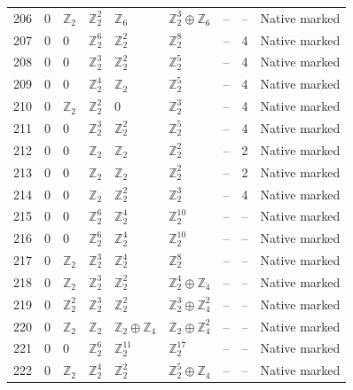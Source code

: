 \documentclass[10pt]{article}
\begin{document}
\begin{longtable}{r|lllll|rrl}
206 & $0$ & $\mathbb{Z}_{2}$ & $\mathbb{Z}_{2}^{2}$ & $\mathbb{Z}_{6}$ & $\mathbb{Z}_{2}^{3}\oplus \mathbb{Z}_{6}$ & -- & -- & Native marked\\
207 & $0$ & $0$ & $\mathbb{Z}_{2}^{6}$ & $\mathbb{Z}_{2}^{2}$ & $\mathbb{Z}_{2}^{8}$ & -- & 4 & Native marked\\
208 & $0$ & $0$ & $\mathbb{Z}_{2}^{3}$ & $\mathbb{Z}_{2}^{2}$ & $\mathbb{Z}_{2}^{5}$ & -- & 4 & Native marked\\
209 & $0$ & $0$ & $\mathbb{Z}_{2}^{4}$ & $\mathbb{Z}_{2}$ & $\mathbb{Z}_{2}^{5}$ & -- & 4 & Native marked\\
210 & $0$ & $\mathbb{Z}_{2}$ & $\mathbb{Z}_{2}^{2}$ & $0$ & $\mathbb{Z}_{2}^{3}$ & -- & 4 & Native marked\\
211 & $0$ & $0$ & $\mathbb{Z}_{2}^{3}$ & $\mathbb{Z}_{2}^{2}$ & $\mathbb{Z}_{2}^{5}$ & -- & 4 & Native marked\\
212 & $0$ & $0$ & $\mathbb{Z}_{2}$ & $\mathbb{Z}_{2}$ & $\mathbb{Z}_{2}^{2}$ & -- & 2 & Native marked\\
213 & $0$ & $0$ & $\mathbb{Z}_{2}$ & $\mathbb{Z}_{2}$ & $\mathbb{Z}_{2}^{2}$ & -- & 2 & Native marked\\
214 & $0$ & $0$ & $\mathbb{Z}_{2}$ & $\mathbb{Z}_{2}^{2}$ & $\mathbb{Z}_{2}^{3}$ & -- & 4 & Native marked\\
215 & $0$ & $0$ & $\mathbb{Z}_{2}^{6}$ & $\mathbb{Z}_{2}^{4}$ & $\mathbb{Z}_{2}^{10}$ & -- & -- & Native marked\\
216 & $0$ & $0$ & $\mathbb{Z}_{2}^{6}$ & $\mathbb{Z}_{2}^{4}$ & $\mathbb{Z}_{2}^{10}$ & -- & -- & Native marked\\
217 & $0$ & $\mathbb{Z}_{2}$ & $\mathbb{Z}_{2}^{3}$ & $\mathbb{Z}_{2}^{4}$ & $\mathbb{Z}_{2}^{8}$ & -- & -- & Native marked\\
218 & $0$ & $\mathbb{Z}_{2}$ & $\mathbb{Z}_{2}^{3}$ & $\mathbb{Z}_{2}^{2}$ & $\mathbb{Z}_{2}^{4}\oplus \mathbb{Z}_{4}$ & -- & -- & Native marked\\
219 & $0$ & $\mathbb{Z}_{2}^{2}$ & $\mathbb{Z}_{2}^{3}$ & $\mathbb{Z}_{2}^{2}$ & $\mathbb{Z}_{2}^{3}\oplus \mathbb{Z}_{4}^{2}$ & -- & -- & Native marked\\
220 & $0$ & $\mathbb{Z}_{2}$ & $\mathbb{Z}_{2}$ & $\mathbb{Z}_{2}\oplus \mathbb{Z}_{4}$ & $\mathbb{Z}_{2}\oplus \mathbb{Z}_{4}^{2}$ & -- & -- & Native marked\\
221 & $0$ & $0$ & $\mathbb{Z}_{2}^{6}$ & $\mathbb{Z}_{2}^{11}$ & $\mathbb{Z}_{2}^{17}$ & -- & -- & Native marked\\
222 & $0$ & $\mathbb{Z}_{2}$ & $\mathbb{Z}_{2}^{4}$ & $\mathbb{Z}_{2}^{2}$ & $\mathbb{Z}_{2}^{5}\oplus \mathbb{Z}_{4}$ & -- & -- & Native marked\\

\end{longtable}
\end{document}
